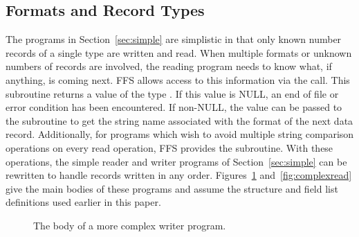 \subsection{Formats and Record Types}

The programs in Section~\ref{sec:simple} are simplistic in that only known
number records of a single type are written and read.  When multiple formats
or unknown numbers of records are involved, the reading program needs to know
what, if anything, is coming next.  FFS allows access to this information via
the  call.  This subroutine returns a value of the
type .  If this value is NULL, an end of file or error condition has
been encountered.  If non-NULL, the value can be passed to the subroutine
 to get the string name associated with the format of
the next data record.  Additionally, for programs which wish to avoid multiple
string comparison operations on every read operation, FFS provides the
 subroutine.  With these operations, the simple
reader and writer programs of Section~\ref{sec:simple} can be rewritten to
handle records written in any order.  Figures~\ref{fig:complexwrite}
and~\ref{fig:complexread} give the main bodies of these programs and assume the
structure and field list definitions used earlier in this paper.
\begin{figure}
\caption{The body of a more complex writer program.\label{fig:complexwrite}}
\end{figure}
